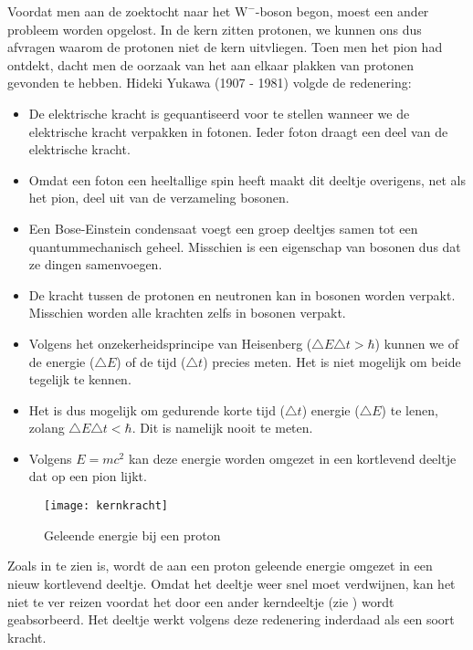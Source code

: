Voordat men aan de zoektocht naar het $\mathrm{W}^{-}$-boson begon,
moest een ander probleem worden opgelost. In de kern zitten protonen,
we kunnen ons dus afvragen waarom de protonen niet de kern uitvliegen.
Toen men het pion had ontdekt, dacht men de oorzaak van het aan elkaar
plakken van protonen gevonden te hebben. Hideki Yukawa (1907 - 1981)
volgde de redenering:
\begin{itemize}
\item De elektrische kracht is gequantiseerd voor te stellen wanneer we
de elektrische kracht verpakken in fotonen. Ieder foton draagt een
deel van de elektrische kracht. 
\item Omdat een foton een heeltallige spin heeft maakt dit deeltje overigens,
net als het pion, deel uit van de verzameling bosonen.
\item Een Bose-Einstein condensaat voegt een groep deeltjes samen tot een
quantummechanisch geheel. Misschien is een eigenschap van bosonen
dus dat ze dingen samenvoegen.
\item De kracht tussen de protonen en neutronen kan in bosonen worden verpakt.
Misschien worden alle krachten zelfs in bosonen verpakt.
\item Volgens het onzekerheidsprincipe van Heisenberg ($\triangle E\triangle t>\hbar$)
kunnen we of de energie ($\triangle E$) of de tijd ($\triangle t$)
precies meten. Het is niet mogelijk om beide tegelijk te kennen.
\item Het is dus mogelijk om gedurende korte tijd ($\triangle t$) energie
($\triangle E$) te lenen, zolang $\triangle E\triangle t<\hbar$.
Dit is namelijk nooit te meten.
\item Volgens $E=mc^{2}$ kan deze energie worden omgezet in een kortlevend
deeltje dat op een pion lijkt.
\end{itemize}
\begin{figure}[h]
\noindent \begin{centering}
\texttt{[image: kernkracht]}
\par\end{centering}

\caption{\label{fig:Geleende-energie-bij}Geleende energie bij een proton}
\end{figure}


Zoals in  te zien is, wordt de aan
een proton geleende energie omgezet in een nieuw kortlevend deeltje.
Omdat het deeltje weer snel moet verdwijnen, kan het niet te ver reizen
voordat het door een ander kerndeeltje (zie
) wordt geabsorbeerd. Het deeltje werkt
volgens deze redenering inderdaad als een soort kracht. 

